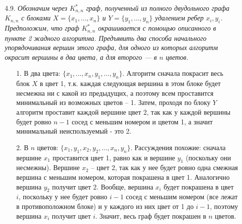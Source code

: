 \documentclass[10pt,a4paper]{article}
\begin{document}
\begin{enumerate}
	\item[4.9.] \textit{Обозначим через $K_{n, n}^{*}$ граф, полученный из полного двудольного графа $K_{n, n}$ с блоками $X = \{x_1, \ldots, x_n\}$ и $Y = \{y_1, \ldots, y_n\}$ удалением ребер ${x_i, y_i}$. Предположим, что граф $K_{n, n}^{*}$ окрашивается с помощью описанного в пункте 2 жадного алгоритма. Предъявить два способа начального упорядочивания вершин этого графа, для одного из которых алгоритм окрасит вершины в два цвета, а для второго — в $n$ цветов.}
	\begin{enumerate}
		\item[1.] В два цвета: $\{x_1, \ldots, x_n, y_1, \ldots, y_n\}$. Алгоритм сначала покрасит весь блок $X$ в цвет 1, т.к. каждая следующая вершина в этом блоке будет несмежна ни с какой из предыдущих, а поэтому всем проставится минимальный из возможных цветов -- 1. Затем, проходя по блоку $Y$ алгоритм проставит каждой вершине цвет 2, так как у каждой вершины будет ровно $n-1$ сосед с меньшим номером и цветом 1, а значит минимальный неиспользуемый - это 2.
		\item[2.] В $n$ цветов: $\{x_1, y_1, x_2, y_2, \ldots, x_n, y_n\}$. Рассуждения похожие: сначала вершине $x_1$ проставится цвет 1, равно как и вершине $y_1$  (поскольку они несмежны). Вершине $x_2$ -- цвет 2, так как у нее будет ровно одна смежная вершина с меньшим номером, которая покрашена в цвет 1. Аналогично вершина $y_2$ получит цвет 2. Вообще, вершина $x_i$ будет покрашена в цвет $i$, поскольку у нее будет ровно $i-1$ сосед с меньшим номером (все лежат в противоположном блоке) и у каждого из них цвет от 1 до $i-1$, поэтому вершина $x_i$ получит цвет  $i$.
		Значит, весь граф будет покрашен в $n$ цветов.
	\end{enumerate}
	

\end{enumerate}
\end{document}
